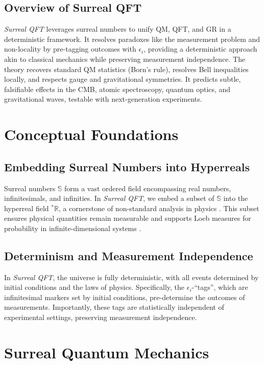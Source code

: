 \documentclass{article}
\begin{document}
\subsection{Overview of Surreal QFT}
\textit{Surreal QFT} leverages surreal numbers to unify QM, QFT, and GR in a deterministic framework. It resolves paradoxes like the measurement problem and non-locality by pre-tagging outcomes with \(\epsilon_i\), providing a deterministic approach akin to classical mechanics while preserving measurement independence. The theory recovers standard QM statistics (Born's rule), resolves Bell inequalities locally, and respects gauge and gravitational symmetries. It predicts subtle, falsifiable effects in the CMB, atomic spectroscopy, quantum optics, and gravitational waves, testable with next-generation experiments.

\section{Conceptual Foundations}
\subsection{Embedding Surreal Numbers into Hyperreals}
Surreal numbers \(\mathbb{S}\) form a vast ordered field encompassing real numbers, infinitesimals, and infinities. In \textit{Surreal QFT}, we embed a subset of \(\mathbb{S}\) into the hyperreal field \({}^*\mathbb{R}\), a cornerstone of non-standard analysis in physics \cite{Goldblatt1998}. This subset ensures physical quantities remain measurable and supports Loeb measures for probability in infinite-dimensional systems \cite{Albeverio1986}.

\subsection{Determinism and Measurement Independence}
In \textit{Surreal QFT}, the universe is fully deterministic, with all events determined by initial conditions and the laws of physics. Specifically, the \(\epsilon_i\)-``tags'', which are infinitesimal markers set by initial conditions, pre-determine the outcomes of measurements. Importantly, these tags are statistically independent of experimental settings, preserving measurement independence.

\section{Surreal Quantum Mechanics}
\end{document}

